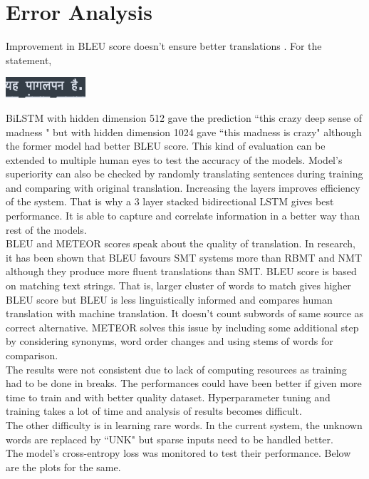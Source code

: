 \documentclass[11pt, oneside]{article}   	%
\begin{document}
\section{Error Analysis}
Improvement in BLEU score\cite{bleu} doesn't ensure better translations \cite{Zhang04interpretingbleu/nist}. For the statement,\begin{center}
\includegraphics[scale=0.5]{hin.png} 
\end{center}
BiLSTM with hidden dimension 512 gave the prediction ``this crazy deep sense of madness
" but with hidden dimension 1024 gave ``this madness is crazy" although the former model had better BLEU score. This kind of evaluation can be extended to multiple human eyes to test the accuracy of the models. Model's superiority can also be checked by randomly translating sentences during training and comparing with original translation. Increasing the layers improves efficiency of the system. That is why a 3 layer stacked bidirectional LSTM gives best performance. It is able to capture and correlate information in a better way than rest of the models.
\\
BLEU and METEOR scores speak about the quality of translation. In research, it has been shown that BLEU favours SMT systems more than RBMT and NMT although they produce more fluent translations than SMT. BLEU score is based on matching text strings. That is, larger cluster of words to match gives higher BLEU score but BLEU is less linguistically informed and compares human translation with machine translation. It doesn't count subwords of same source as correct alternative. METEOR solves this issue by including some additional step by considering synonyms, word order changes and using stems of words for comparison.
\\
The results were not consistent due to lack of computing resources as training had to be done in breaks. The performances could have been better if given more time to train and with better quality dataset. Hyperparameter tuning and training takes a lot of time and analysis of results becomes difficult. \\
The other difficulty is in learning rare words. In the current system, the unknown words are replaced by ``UNK" but sparse inputs need to be handled better. 
\\
The model's cross-entropy loss was monitored to test their performance. Below are the plots for the same.
\end{document}

